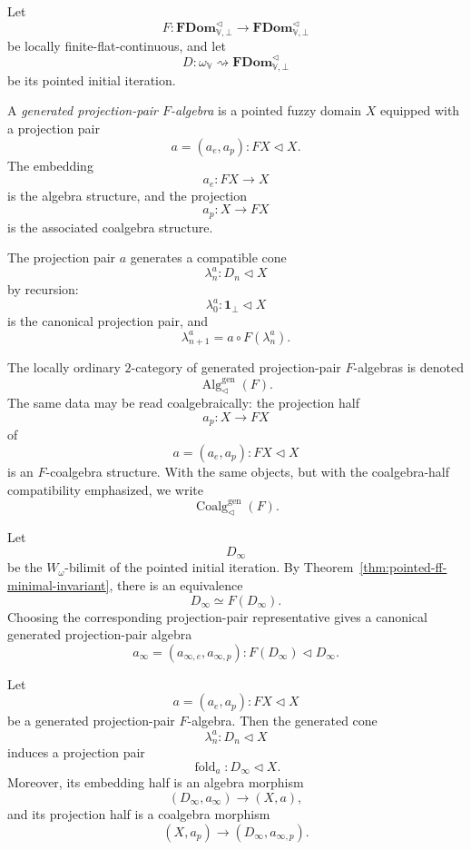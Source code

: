 \begin{definition}
\label{def:generated-projection-pair-F-algebra}
Let
\[
    F:
    \mathbf{FDom}^{\triangleleft}_{\mathbb V,\bot}
    \to
    \mathbf{FDom}^{\triangleleft}_{\mathbb V,\bot}
\]
be locally finite-flat-continuous, and let
\[
    D:\omega_{\mathbb V}\rightsquigarrow
    \mathbf{FDom}^{\triangleleft}_{\mathbb V,\bot}
\]
be its pointed initial iteration.

A \emph{generated projection-pair \(F\)-algebra} is a pointed fuzzy domain
\(X\) equipped with a projection pair
\[
    a=(a_e,a_p):FX\triangleleft X.
\]
The embedding
\[
    a_e:FX\to X
\]
is the algebra structure, and the projection
\[
    a_p:X\to FX
\]
is the associated coalgebra structure.

The projection pair \(a\) generates a compatible cone
\[
    \lambda^a_n:D_n\triangleleft X
\]
by recursion:
\[
    \lambda^a_0:\mathbf 1_\bot\triangleleft X
\]
is the canonical projection pair, and
\[
    \lambda^a_{n+1}
    =
    a\circ F(\lambda^a_n).
\]
\end{definition}

\begin{definition}
\label{def:generated-algebra-coalgebra-categories}
The locally ordinary \(2\)-category of generated projection-pair \(F\)-algebras
is denoted
\[
    \operatorname{Alg}^{\mathrm{gen}}_{\triangleleft}(F).
\]
The same data may be read coalgebraically: the projection half
\[
    a_p:X\to FX
\]
of
\[
    a=(a_e,a_p):FX\triangleleft X
\]
is an \(F\)-coalgebra structure.  With the same objects, but with the
coalgebra-half compatibility emphasized, we write
\[
    \operatorname{Coalg}^{\mathrm{gen}}_{\triangleleft}(F).
\]
\end{definition}

\begin{construction}
\label{con:canonical-generated-algebra-coalgebra}
Let
\[
    D_\infty
\]
be the \(W_\omega\)-bilimit of the pointed initial iteration.  By
Theorem~\ref{thm:pointed-ff-minimal-invariant}, there is an equivalence
\[
    D_\infty\simeq F(D_\infty).
\]
Choosing the corresponding projection-pair representative gives a canonical
generated projection-pair algebra
\[
    a_\infty=(a_{\infty,e},a_{\infty,p}):
    F(D_\infty)\triangleleft D_\infty.
\]
\end{construction}

\begin{lemma}
\label{lem:generated-folds-from-bilimit}
Let
\[
    a=(a_e,a_p):FX\triangleleft X
\]
be a generated projection-pair \(F\)-algebra.  Then the generated cone
\[
    \lambda^a_n:D_n\triangleleft X
\]
induces a projection pair
\[
    \operatorname{fold}_a:D_\infty\triangleleft X.
\]
Moreover, its embedding half is an algebra morphism
\[
    (D_\infty,a_\infty)\to(X,a),
\]
and its projection half is a coalgebra morphism
\[
    (X,a_p)\to(D_\infty,a_{\infty,p}).
\]
\end{lemma}

